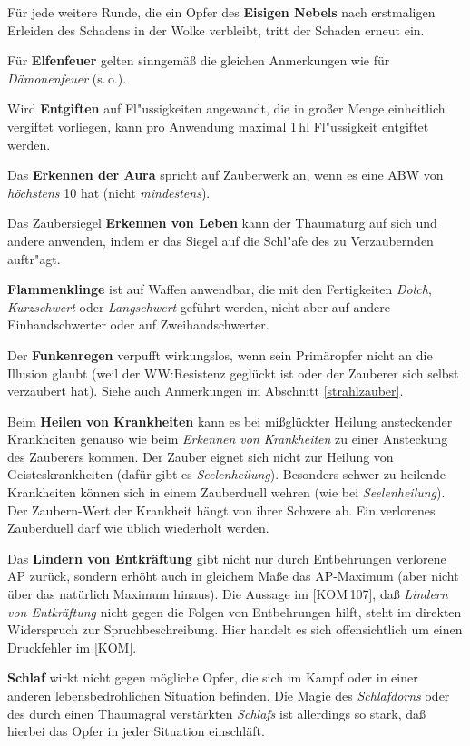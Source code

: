 \documentclass[10pt,a4paper,germanpar]{article}
\begin{document}
Für jede weitere Runde, die ein Opfer des \textbf{Eisigen Nebels} nach
erstmaligen Erleiden des Schadens in der Wolke verbleibt, tritt der
Schaden erneut ein.

Für \textbf{Elfenfeuer} gelten sinngemäß die gleichen Anmerkungen
wie für \emph{Dämonenfeuer} (s.\,o.).

Wird \textbf{Entgiften} auf Fl"ussigkeiten angewandt, die in großer
Menge einheitlich vergiftet vorliegen, kann pro Anwendung maximal
1\,hl Fl"ussigkeit entgiftet werden.

Das \textbf{Erkennen der Aura} spricht auf Zauberwerk an, wenn es eine ABW von
\emph{höchstens} 10 hat (nicht \emph{mindestens}).

Das Zaubersiegel \textbf{Erkennen von Leben} kann der Thaumaturg auf
sich und andere anwenden, indem er das Siegel auf die Schl"afe des zu
Verzaubernden auftr"agt.

\textbf{Flammenklinge} ist auf Waffen anwendbar, die mit den
Fertigkeiten \emph{Dolch}, \emph{Kurzschwert} oder \emph{Langschwert}
geführt werden, nicht aber auf andere Einhandschwerter oder auf
Zweihandschwerter.

Der \textbf{Funkenregen} verpufft wirkungslos, wenn sein Primäropfer
nicht an die Illusion glaubt (weil der WW:Resistenz geglückt ist oder
der Zauberer sich selbst verzaubert hat). Siehe auch Anmerkungen im
Abschnitt \ref{strahlzauber}.

Beim \textbf{Heilen von Krankheiten} kann es bei mißglückter Heilung
ansteckender Krankheiten genauso wie beim \emph{Erkennen von
  Krankheiten} zu einer Ansteckung des Zauberers kommen. Der Zauber
eignet sich nicht zur Heilung von Geisteskrankheiten (dafür gibt es
\emph{Seelenheilung}). Besonders schwer zu heilende Krankheiten können
sich in einem Zauberduell wehren (wie bei \emph{Seelenheilung}). Der
Zaubern-Wert der Krankheit hängt von ihrer Schwere ab. Ein verlorenes
Zauberduell darf wie üblich wiederholt werden.

Das \textbf{Lindern von Entkräftung} gibt nicht nur durch Entbehrungen
verlorene AP zurück, sondern erhöht auch in gleichem Maße das
AP-Maximum (aber nicht über das natürlich Maximum hinaus). Die Aussage
im [KOM\,107], daß \emph{Lindern von Entkräftung} nicht gegen die
Folgen von Entbehrungen hilft, steht im direkten Widerspruch zur
Spruchbeschreibung. Hier handelt es sich offensichtlich um einen
Druckfehler im [KOM].

\textbf{Schlaf} wirkt nicht gegen mögliche Opfer, die sich im Kampf
oder in einer anderen lebensbedrohlichen Situation befinden.
Die Magie des \emph{Schlafdorns} oder des durch einen Thaumagral
verstärkten \emph{Schlafs} ist allerdings so stark, daß hierbei das
Opfer in jeder Situation einschläft.
\end{document}
